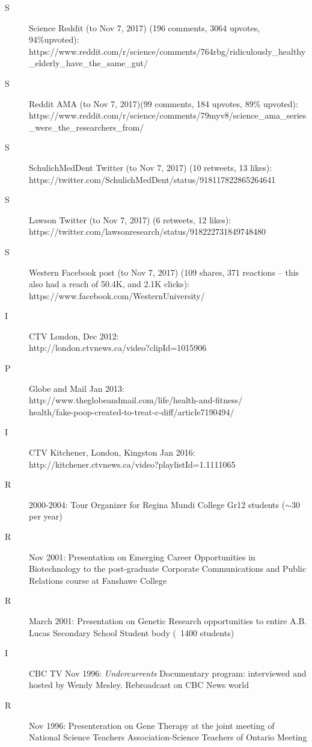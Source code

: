 \documentclass[11pt]{article}
\begin{document}
\begin{description}
\item[S] Science Reddit (to Nov 7, 2017) (196 comments, 3064 upvotes, 94\%upvoted): \\https://www.reddit.com/r/science/comments/764rbg/ridiculously\_healthy\_elderly\_have\_the\_same\_gut/
\item[S] Reddit AMA (to Nov 7, 2017)(99 comments, 184 upvotes, 89\% upvoted): \\https://www.reddit.com/r/science/comments/79myv8/science\_ama\_series\_were\_the\_researchers\_from/
\item[S] SchulichMedDent Twitter (to Nov 7, 2017) (10 retweets, 13 likes): \\https://twitter.com/SchulichMedDent/status/918117822865264641
\item[S] Lawson Twitter (to Nov 7, 2017) (6 retweets, 12 likes): \\https://twitter.com/lawsonresearch/status/918222731849748480
\item[S] Western Facebook post (to Nov 7, 2017) (109 shares, 371 reactions – this also had a reach of 50.4K, and 2.1K clicks): https://www.facebook.com/WesternUniversity/
\item[I] CTV London, Dec 2012: \\http://london.ctvnews.ca/video?clipId=1015906
\item[P] Globe and Mail Jan 2013: \\http://www.theglobeandmail.com/life/health-and-fitness/\\health/fake-poop-created-to-treat-c-diff/article7190494/
\item[I] CTV Kitchener, London, Kingston Jan 2016:\\http://kitchener.ctvnews.ca/video?playlistId=1.1111065
\item[R] 2000-2004: Tour Organizer for Regina Mundi College Gr12 students ($\sim$30 per year)
\item[R] Nov 2001: Presentation on Emerging Career Opportunities in 	Biotechnology to the  post-graduate Corporate 	Communications and Public Relations course at	Fanshawe College
\item[R] March 2001: Presentation on Genetic Research opportunities to entire A.B. Lucas Secondary School	Student body (~1400 students)
\item[I] CBC TV Nov 1996: {\em Undercurrents} Documentary program: interviewed and hosted by Wendy Mesley. Rebroadcast on CBC News world
\item[R] Nov 1996: Presenteration on Gene Therapy at the joint meeting of 	National Science Teachers Association-Science 	Teachers of Ontario Meeting

\end{description}
\end{document}
